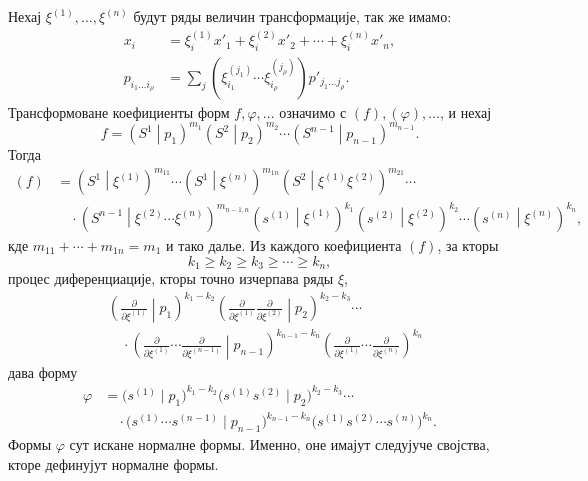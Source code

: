 ﻿\documentclass[11pt]{article}
\newcommand{\pair}[2]{\left(#1\middle|#2\right)}
\begin{document}
Нехај $\xi^{(1)},\ldots,\xi^{(n)}$ будут ряды величин трансформације, так же имамо:
\begin{equation}
\begin{aligned}
x_i&=\xi_i^{(1)}x'_1+\xi_i^{(2)}x'_2+\cdots+\xi_i^{(n)}x'_n,\\
p_{i_1\ldots i_\rho}&=\sum_j(\xi_{i_1}^{(j_1)}\cdots \xi_{i_\rho}^{(j_\rho)})p'_{j_1\ldots j_\rho}.
\end{aligned}
\tag{47}
\end{equation}
Трансформоване коефициенты форм $f,\varphi,\ldots$ означимо с $(f),(\varphi),\ldots$, и нехај
\[
 f=\pair{S^1}{p_1}^{m_1}\pair{S^2}{p_2}^{m_2}\cdots\pair{S^{n-1}}{p_{n-1}}^{m_{n-1}}.
\]
Тогда
\begin{equation}
\begin{aligned}
(f)&=\pair{S^1}{\xi^{(1)}}^{m_{11}}\cdots
\pair{S^1}{\xi^{(n)}}^{m_{1n}}
\pair{S^2}{\xi^{(1)}\xi^{(2)}}^{m_{21}}\cdots\\
&\quad\cdot
\pair{S^{n-1}}{\xi^{(2)}\cdots\xi^{(n)}}^{m_{n-1,n}}
\pair{s^{(1)}}{\xi^{(1)}}^{k_1}
\pair{s^{(2)}}{\xi^{(2)}}^{k_2}\cdots
\pair{s^{(n)}}{\xi^{(n)}}^{k_n},
\end{aligned}
\tag{48}
\end{equation}
кде $m_{11}+\cdots+m_{1n}=m_1$ и тако далье. Из каждого коефициента $(f)$, за кторы
\begin{equation}
 k_1\ge k_2\ge k_3\ge\cdots\ge k_n,
\tag{49}
\end{equation}
процес диференциације, кторы точно изчерпава ряды $\xi$,
\begin{equation}
\begin{aligned}
&\left(\frac{\partial}{\partial\xi^{(1)}}\middle|p_1\right)^{k_1-k_2}
\left(\frac{\partial}{\partial\xi^{(1)}}\frac{\partial}{\partial\xi^{(2)}}\middle|p_2\right)^{k_2-k_3}\cdots\\
&\quad\cdot
\left(\frac{\partial}{\partial\xi^{(1)}}\cdots\frac{\partial}{\partial\xi^{(n-1)}}\middle|p_{n-1}\right)^{k_{n-1}-k_n}
\left(\frac{\partial}{\partial\xi^{(1)}}\cdots\frac{\partial}{\partial\xi^{(n)}}\right)^{k_n}
\end{aligned}
\tag{50}
\end{equation}
дава форму
\begin{equation}
\begin{aligned}
 \varphi&=\bigl(s^{(1)}\mid p_1\bigr)^{k_1-k_2}
 \bigl(s^{(1)}s^{(2)}\mid p_2\bigr)^{k_2-k_3}\cdots\\
 &\quad\cdot
 \bigl(s^{(1)}\cdots s^{(n-1)}\mid p_{n-1}\bigr)^{k_{n-1}-k_n}
 \bigl(s^{(1)}s^{(2)}\cdots s^{(n)}\bigr)^{k_n}.
\end{aligned}
\tag{51}
\end{equation}
Формы $\varphi$ сут искане нормалне формы. Именно, оне имајут следујуче својства, кторе дефинујут нормалне формы.
\end{document}
